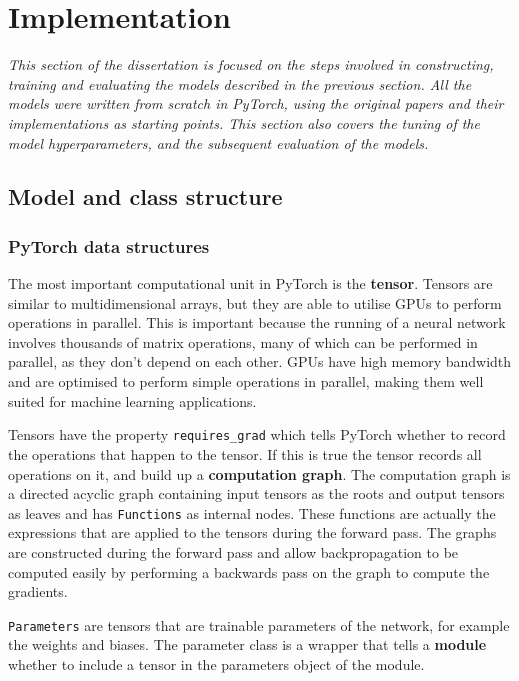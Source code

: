 \chapter{Implementation}

\textit{This section of the dissertation is focused on the steps involved in constructing, training and evaluating the models 
described in the previous section.
All the models were written from scratch in PyTorch, using the original papers and their implementations as starting points.
This section also covers the tuning of the model hyperparameters, and the subsequent evaluation of the models.}

\section{Model and class structure}

\subsection{PyTorch data structures}
The most important computational unit in PyTorch is the \textbf{tensor}. Tensors are similar to multidimensional arrays, but they are able to 
utilise GPUs to perform operations in parallel. This is important because the running of a neural network involves thousands of matrix 
operations, many of which can be performed in parallel, as they don't depend on each other. GPUs have high memory bandwidth and are 
optimised to perform simple operations in parallel, making them well suited for machine learning applications.

Tensors have the property \texttt{requires\_grad} which tells PyTorch whether to record the operations that happen to the tensor. If 
this is true the tensor records all operations on it, and build up a \textbf{computation graph}. The computation graph is a 
directed acyclic graph containing input tensors as the roots and output
tensors as leaves and has \texttt{Functions} as internal nodes. These functions are actually the expressions that are applied to the 
tensors during the forward pass. The graphs are constructed during the forward pass and allow backpropagation to be computed easily by performing a 
backwards pass on the graph to compute the gradients.

\texttt{Parameters} are tensors that are trainable parameters of the network, for example the weights and biases. The parameter class is a 
wrapper that tells a \textbf{module} whether to include a tensor in the parameters object of the module.

